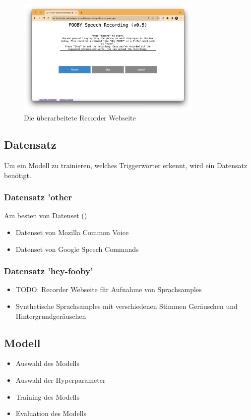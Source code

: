 \documentclass[11pt,a4paper]{article}
\begin{document}
\begin{figure}[h]
    \centering
    \includegraphics[width=0.8\textwidth]{img/ba-recorder-website.png} 
    \caption{Die überarbeitete Recorder Webseite}
    \label{fig:recorder_webseite}
\end{figure}


\subsection{Datensatz}
Um ein Modell zu trainieren, welches Triggerwörter erkennt, wird ein Datensatz benötigt.

\subsubsection{Datensatz 'other}
Am besten von Datenset (\cite{warden2018speech})
\begin{itemize}
	\item Datenset von Mozilla Common Voice
	\item Datenset von Google Speech Commands
\end{itemize}

\subsubsection{Datensatz 'hey-fooby'}
\begin{itemize}
	\item TODO: Recorder Webseite für Aufnahme von Sprachsamples
	\item Synthetische Sprachsamples mit verschiedenen Stimmen Geräuschen und Hintergrundgeräuschen
\end{itemize}

\subsection{Modell}
\begin{itemize}
	\item Auswahl des Modells
	\item Auswahl der Hyperparameter
	\item Training des Modells
	\item Evaluation des Modells
\end{itemize}
\end{document}
